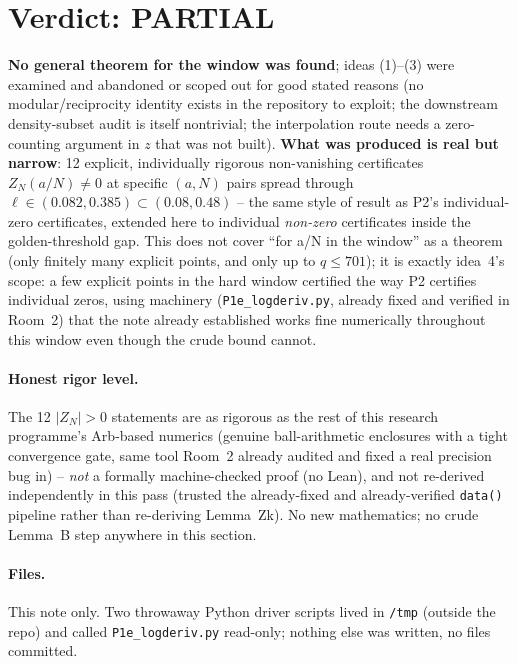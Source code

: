 \documentclass[11pt]{article}
\begin{document}
\section{Verdict: PARTIAL}
\textbf{No general theorem for the window was found}; ideas (1)--(3) were examined and abandoned
or scoped out for good stated reasons (no modular/reciprocity identity exists in the repository to
exploit; the downstream density-subset audit is itself nontrivial; the interpolation route needs a
zero-counting argument in $z$ that was not built). \textbf{What was produced is real but narrow}:
12 explicit, individually rigorous non-vanishing certificates $Z_N(a/N)\ne0$ at specific
$(a,N)$ pairs spread through $\ell\in(0.082,0.385)\subset(0.08,0.48)$ -- the same style of result
as P2's individual-zero certificates, extended here to individual \emph{non-zero} certificates
inside the golden-threshold gap. This does not cover ``for a/N in the window'' as a theorem (only
finitely many explicit points, and only up to $q\le701$); it is exactly idea~4's scope: a few
explicit points in the hard window certified the way P2 certifies individual zeros, using
machinery (\texttt{P1e\_logderiv.py}, already fixed and verified in Room~2) that the note already
established works fine numerically throughout this window even though the crude bound cannot.

\paragraph{Honest rigor level.} The 12 $|Z_N|>0$ statements are as rigorous as the rest of this
research programme's Arb-based numerics (genuine ball-arithmetic enclosures with a tight
convergence gate, same tool Room~2 already audited and fixed a real precision bug in) -- \emph{not}
a formally machine-checked proof (no Lean), and not re-derived independently in this pass (trusted
the already-fixed and already-verified \texttt{data()} pipeline rather than re-deriving Lemma~Zk).
No new mathematics; no crude Lemma~B step anywhere in this section.

\paragraph{Files.} This note only. Two throwaway Python driver scripts lived in \texttt{/tmp}
(outside the repo) and called \texttt{P1e\_logderiv.py} read-only; nothing else was written, no
files committed.
\end{document}
